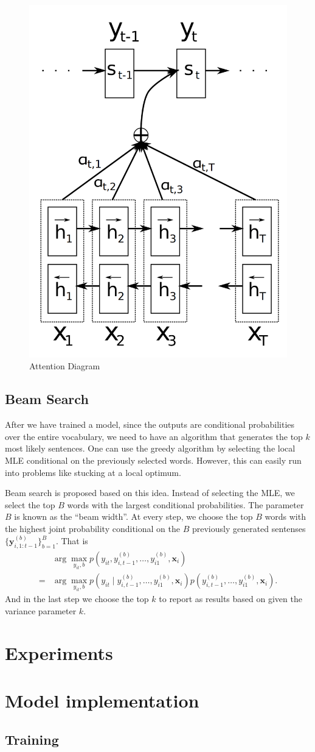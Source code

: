 \documentclass[12pt]{article}
\begin{document}
\begin{figure}
	\centering
	\includegraphics[width=0.4\linewidth]{figs/attn_diagram}
	\caption{Attention Diagram}
	\label{attn_diagram}
\end{figure}


\subsection{Beam Search}
\label{sub:beam}
After we have trained a model, since the outputs are conditional probabilities over the entire vocabulary, we need to have an algorithm that generates the top $k$ most likely sentences. One can use the greedy algorithm by selecting the local MLE conditional on the previously selected words. However, this can easily run into problems like stucking at a local optimum.

Beam search is proposed based on this idea. Instead of selecting the MLE, we select the top $B$ words with the largest conditional probabilities. The parameter $B$ is known as the ``beam width''. At every step, we choose the top $B$ words with the highest joint probability conditional on the $B$ previously generated sentenses $\{\bm y_{i, 1:t-1}^{(b)}\}_{b=1}^B$. That is
\begin{align}
	&\arg \max_{y_{it}, b} p(y_{it}, y_{i,t-1}^{(b)}, \dots, y_{i1}^{(b)}, \bm x_i)\nonumber\\
	=& \arg \max_{y_{it}, b} p(y_{it} \mid y_{i,t-1}^{(b)}, \dots, y_{i1}^{(b)}, \bm x_i) p(y_{i,t-1}^{(b)}, \dots, y_{i1}^{(b)}, \bm x_i).
\end{align}
And in the last step we choose the top $k$ to report as results based on given the variance parameter $k$.

\section{Experiments}





\appendix
\section{Model implementation}
\subsection{Training}
\end{document}
